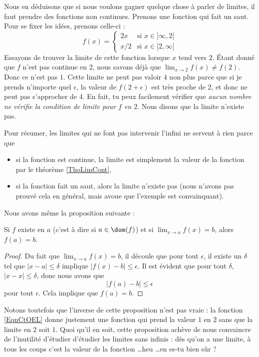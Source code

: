 Nous en déduisons que si nous voulons gagner quelque chose à parler de limites, il faut prendre des fonctions non continues. Prenons une fonction qui fait un saut. Pour se fixer les idées, prenons celle-ci :
\begin{equation}    \label{EqnCtOEL}
f(x)=
\begin{cases}
2x&\text{si $x\in]\infty,2[$}\\
x/2&\text{si $x\in[2,\infty[$}
\end{cases}
\end{equation}  
Essayons de trouver la limite de cette fonction lorsque $x$ tend vers $2$. Étant donné que $f$ n'est pas continue en $2$, nous savons déjà que $\lim_{x\to 2}f(x)\neq f(2)$. Donc ce n'est pas $1$. Cette limite ne peut pas valoir $4$ non plus parce que si je prends n'importe quel $\epsilon$, la valeur de $f(2+\epsilon)$ est très proche de $2$, et donc ne peut pas s'approcher de $4$. En fait, tu peux facilement vérifier que \emph{aucun nombre ne vérifie la condition de limite pour $f$ en $2$}. Nous disons que la limite n'existe pas.

Pour résumer, les limites qui ne font pas intervenir l'infini ne servent à rien parce que
\begin{itemize}
\item si la fonction est continue, la limite est simplement la valeur de la fonction par le théorème \ref{ThoLimCont},
\item si la fonction fait un saut, alors la limite n'existe pas (nous n'avons pas prouvé cela en général, mais avoue que l'exemple est convainquant).
\end{itemize}
Nous avons même la proposition suivante :
\begin{proposition}     \label{PropExisteLimVql}
Si $f$ existe en $a$ (c'est à dire si $a\in\dom(f)$) et si $\lim_{x\to a}f(x)=b$, alors $f(a)=b$.
\end{proposition}

\begin{proof}
Du fait que $\lim_{x\to a}f(x)=b$, il découle que pour tout $\epsilon$, il existe un $\delta$ tel que $| x-a |\leq \delta$ implique $| f(x)-b |\leq \epsilon$. Il est évident que pour tout $\delta$, $| x-x |\leq \delta$, donc nous avons que 
\[ 
  | f(a)-b |\leq\epsilon
\]
pour tout $\epsilon$. Cela implique que $f(a)=b$.
\end{proof}
Notons toutefois que l'inverse de cette proposition n'est pas vraie : la fonction \eqref{EqnCtOEL} donne justement une fonction qui prend la valeur $1$ en $2$ sans que la limite en $2$ soit $1$. Quoi qu'il en soit, cette proposition achève de nous convaincre de l'inutilité d'étudier d'étudier les limites sans infinis : dès qu'on a une limite, à tous les coups c'est la valeur de la fonction \ldots heu \ldots en es-tu bien sûr ?

